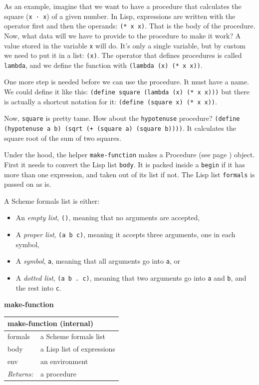 \documentclass[twoside,9pt]{report}
\begin{document}
As an example, imagine that we want to have a procedure that calculates the square (\texttt{x · x}) of a given number. In Lisp, expressions are written with the operator first and then the operands: \texttt{(* x x)}. That is the body of the procedure. Now, what data will we have to provide to the procedure to make it work? A value stored in the variable \texttt{x} will do. It's only a single variable, but by custom we need to put it in a list: \texttt{(x)}. The operator that defines procedures is called \texttt{lambda}, and we define the function with \texttt{(lambda (x) (* x x))}.


One more step is needed before we can use the procedure. It must have a name. We could define it like this: \texttt{(define square (lambda (x) (* x x)))} but there is actually a shortcut notation for it: \texttt{(define (square x) (* x x))}.


Now, \texttt{square} is pretty tame. How about the \texttt{hypotenuse} procedure? \texttt{(define (hypotenuse a b) (sqrt (+ (square a) (square b))))}. It calculates the square root of the sum of two squares.


Under the hood, the helper \texttt{make-function} makes a Procedure (see page \pageref{control}) object. First it needs to convert the Lisp list \texttt{body}. It is packed inside a \texttt{begin} if it has more than one expression, and taken out of its list if not. The Lisp list \texttt{formals} is passed on as is.


A Scheme formals list is either:

\begin{itemize}
\item An \emph{empty list}, \texttt{()}, meaning that no arguments are accepted,
\item A \emph{proper list}, \texttt{(a b c)}, meaning it accepts three arguments, one in each symbol,
\item A \emph{symbol}, \texttt{a}, meaning that all arguments go into \texttt{a}, or
\item A \emph{dotted list}, \texttt{(a b . c)}, meaning that two arguments go into \texttt{a} and \texttt{b}, and the rest into \texttt{c}.
\end{itemize}

\textbf{make-function}

\begin{tabular}{ |l l| }
\hline
\multicolumn{2}{|l|}{make-function (internal)} \\
\hline
formals & a Scheme formals list \\
body & a Lisp list of expressions \\
env & an environment \\
\textit{Returns:} & a procedure \\
\hline
\end{tabular}
\end{document}
